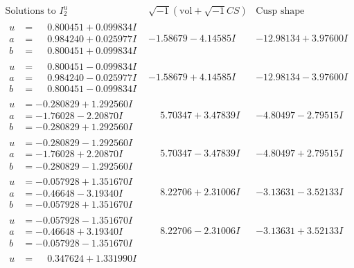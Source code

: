 \documentclass[1p]{elsarticle_modified}
\theoremstyle{definition}
\newcommand{\I}{\sqrt{-1}}
\begin{document}
$$\begin{array}{c|c|c}  
\text{Solutions to }I^u_{2}& \I (\text{vol} + \sqrt{-1}CS) & \text{Cusp shape}\\
 \hline 
\begin{aligned}
u &= \phantom{-}0.800451 + 0.099834 I \\
a &= \phantom{-}0.984240 + 0.025977 I \\
b &= \phantom{-}0.800451 + 0.099834 I\end{aligned}
 & -1.58679 - 4.14585 I & -12.98134 + 3.97600 I \\ \hline\begin{aligned}
u &= \phantom{-}0.800451 - 0.099834 I \\
a &= \phantom{-}0.984240 - 0.025977 I \\
b &= \phantom{-}0.800451 - 0.099834 I\end{aligned}
 & -1.58679 + 4.14585 I & -12.98134 - 3.97600 I \\ \hline\begin{aligned}
u &= -0.280829 + 1.292560 I \\
a &= -1.76028 - 2.20870 I \\
b &= -0.280829 + 1.292560 I\end{aligned}
 & \phantom{-}5.70347 + 3.47839 I & -4.80497 - 2.79515 I \\ \hline\begin{aligned}
u &= -0.280829 - 1.292560 I \\
a &= -1.76028 + 2.20870 I \\
b &= -0.280829 - 1.292560 I\end{aligned}
 & \phantom{-}5.70347 - 3.47839 I & -4.80497 + 2.79515 I \\ \hline\begin{aligned}
u &= -0.057928 + 1.351670 I \\
a &= -0.46648 - 3.19340 I \\
b &= -0.057928 + 1.351670 I\end{aligned}
 & \phantom{-}8.22706 + 2.31006 I & -3.13631 - 3.52133 I \\ \hline\begin{aligned}
u &= -0.057928 - 1.351670 I \\
a &= -0.46648 + 3.19340 I \\
b &= -0.057928 - 1.351670 I\end{aligned}
 & \phantom{-}8.22706 - 2.31006 I & -3.13631 + 3.52133 I \\ \hline\begin{aligned}
u &= \phantom{-}0.347624 + 1.331990 I \\

\end{aligned}
\end{array}$$
\end{document}
